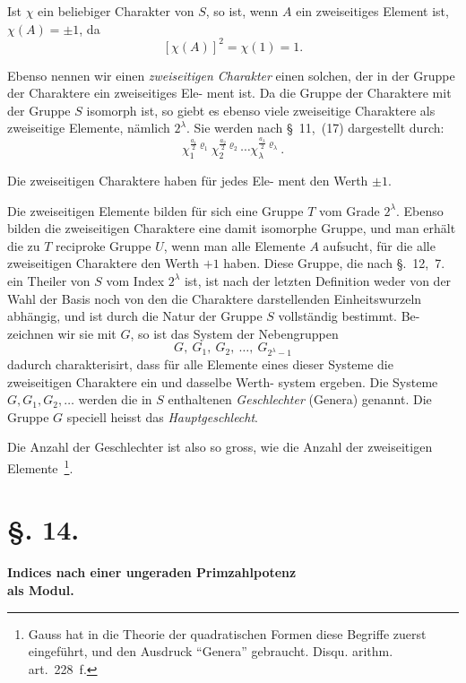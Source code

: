 \documentclass[12pt,a4paper]{article}
\theoremstyle{plain}
\theoremstyle{definition}
\theoremstyle{remark}
\begin{document}
Ist $\chi$ ein beliebiger Charakter von $S$, so ist, wenn $A$ ein
zweiseitiges Element ist, $\chi(A) = \pm 1$, da
\[
[\chi(A)]^2 = \chi(1) = 1.
\]

Ebenso nennen wir einen \emph{zweiseitigen Charakter} einen
solchen, der in der Gruppe der Charaktere ein zweiseitiges Ele-
ment ist. Da die Gruppe der Charaktere mit der Gruppe $S$
isomorph ist, so giebt es ebenso viele zweiseitige Charaktere als
zweiseitige Elemente, nämlich $2^\lambda$. Sie werden nach \S~11,~(17)
dargestellt durch:
\[
\chi_1^{\frac{a_1}{2} \varrho_1} \chi_2^{\frac{a_2}{2} \varrho_2} \cdots \chi_\lambda^{\frac{a_\lambda}{2} \varrho_\lambda}.
\]

Die zweiseitigen Charaktere haben für jedes Ele-
ment den Werth $\pm 1$.

Die zweiseitigen Elemente bilden für sich eine Gruppe $T$
vom Grade $2^\lambda$. Ebenso bilden die zweiseitigen Charaktere eine
damit isomorphe Gruppe, und man erhält die zu $T$ reciproke
Gruppe $U$, wenn man alle Elemente $A$ aufsucht, für die alle
zweiseitigen Charaktere den Werth $+1$ haben. Diese Gruppe,
die nach \S.~12,~7. ein Theiler von $S$ vom Index $2^\lambda$ ist, ist nach
der letzten Definition weder von der Wahl der Basis noch von
den die Charaktere darstellenden Einheitswurzeln abhängig, und
ist durch die Natur der Gruppe $S$ vollständig bestimmt. Be-
zeichnen wir sie mit $G$, so ist das System der Nebengruppen
\begin{equation}\tag{3}
G, \ G_1, \ G_2, \ \ldots, \ G_{2^\lambda - 1}
\end{equation}
dadurch charakterisirt, dass für alle Elemente eines dieser
Systeme die zweiseitigen Charaktere ein und dasselbe Werth-
system ergeben. Die Systeme $G, G_1, G_2, \ldots$ werden die in $S$
enthaltenen \emph{Geschlechter} (Genera) genannt. Die Gruppe $G$
speciell heisst das \emph{Hauptgeschlecht}.

Die Anzahl der Geschlechter ist also so gross, wie
die Anzahl der zweiseitigen Elemente~\footnote{%
Gauss hat in die Theorie der quadratischen Formen diese Begriffe
zuerst eingeführt, und den Ausdruck ``Genera'' gebraucht. Disqu. arithm.
art.~228~f.}.


\section*{\S. 14.}
\begin{center}
\textbf{Indices nach einer ungeraden Primzahlpotenz}\\
\textbf{als Modul.}
\end{center}
\end{document}

